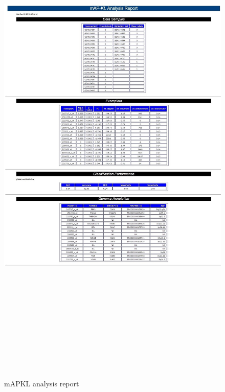 \documentclass[12pt]{article}\usepackage[]{graphicx}\usepackage[usenames,dvipsnames]{color}
\begin{document}
\begin{figure}
\centering
\includegraphics[width=16cm,height=25cm,keepaspectratio]{../man/figures/report}
\caption{mAPKL analysis report}
\end{figure}
\end{document}
